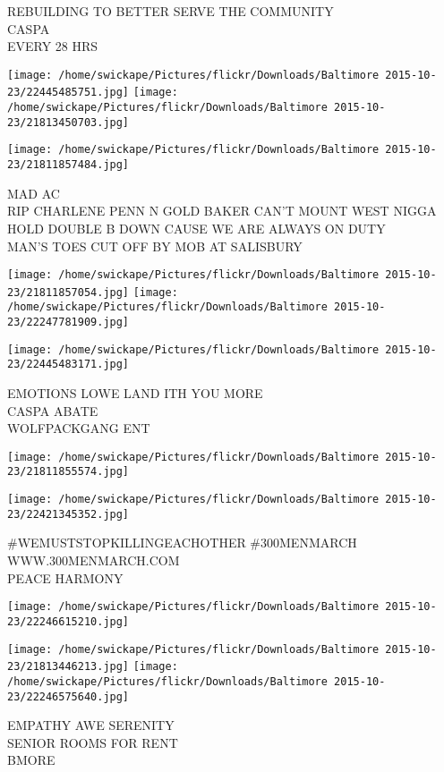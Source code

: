\documentclass[10pt,letterpaper]{article}
\begin{document}
REBUILDING TO BETTER SERVE THE COMMUNITY\\
CASPA\\
EVERY 28 HRS
\pagebreak

\texttt{[image: /home/swickape/Pictures/flickr/Downloads/Baltimore 2015-10-23/22445485751.jpg]}
\texttt{[image: /home/swickape/Pictures/flickr/Downloads/Baltimore 2015-10-23/21813450703.jpg]}

\vspace{0.25in}
\texttt{[image: /home/swickape/Pictures/flickr/Downloads/Baltimore 2015-10-23/21811857484.jpg]}

MAD AC\\
RIP CHARLENE PENN N GOLD BAKER CAN'T MOUNT WEST NIGGA HOLD DOUBLE B DOWN CAUSE WE ARE ALWAYS ON DUTY\\
MAN'S TOES CUT OFF BY MOB AT SALISBURY
\pagebreak

\texttt{[image: /home/swickape/Pictures/flickr/Downloads/Baltimore 2015-10-23/21811857054.jpg]}
\texttt{[image: /home/swickape/Pictures/flickr/Downloads/Baltimore 2015-10-23/22247781909.jpg]}

\texttt{[image: /home/swickape/Pictures/flickr/Downloads/Baltimore 2015-10-23/22445483171.jpg]}

EMOTIONS LOWE LAND ITH YOU MORE\\
CASPA ABATE\\
WOLFPACKGANG ENT
\pagebreak

\texttt{[image: /home/swickape/Pictures/flickr/Downloads/Baltimore 2015-10-23/21811855574.jpg]}

\vspace{0.25in}
\texttt{[image: /home/swickape/Pictures/flickr/Downloads/Baltimore 2015-10-23/22421345352.jpg]}

\#WEMUSTSTOPKILLINGEACHOTHER \#300MENMARCH WWW.300MENMARCH.COM\\
PEACE HARMONY
\pagebreak

\texttt{[image: /home/swickape/Pictures/flickr/Downloads/Baltimore 2015-10-23/22246615210.jpg]}

\vspace{0.25in}
\texttt{[image: /home/swickape/Pictures/flickr/Downloads/Baltimore 2015-10-23/21813446213.jpg]}
\texttt{[image: /home/swickape/Pictures/flickr/Downloads/Baltimore 2015-10-23/22246575640.jpg]}

EMPATHY AWE SERENITY\\
SENIOR ROOMS FOR RENT\\
BMORE
\pagebreak
\end{document}
